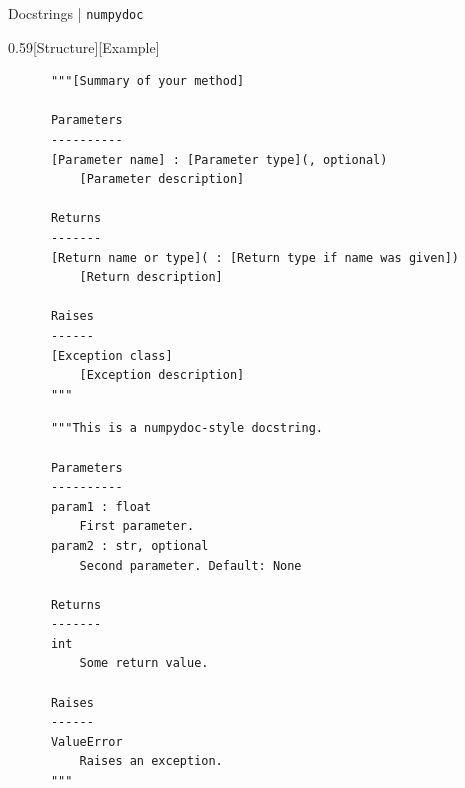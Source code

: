 \begin{frame}[fragile]{%
    Docstrings | \texttt{numpydoc}
    \hfill
  }
  \begin{CodeExplanation}{0.59}[Structure][Example]
    \footnotesize
    \begin{verbatim}
      """[Summary of your method]

      Parameters
      ----------
      [Parameter name] : [Parameter type](, optional)
          [Parameter description]

      Returns
      -------
      [Return name or type]( : [Return type if name was given])
          [Return description]

      Raises
      ------
      [Exception class]
          [Exception description]
      """
    \end{verbatim}
    \Explanation
    \footnotesize
    \begin{verbatim}
      """This is a numpydoc-style docstring.

      Parameters
      ----------
      param1 : float
          First parameter.
      param2 : str, optional
          Second parameter. Default: None

      Returns
      -------
      int
          Some return value.

      Raises
      ------
      ValueError
          Raises an exception.
      """
    \end{verbatim}
  \end{CodeExplanation}
\end{frame}

